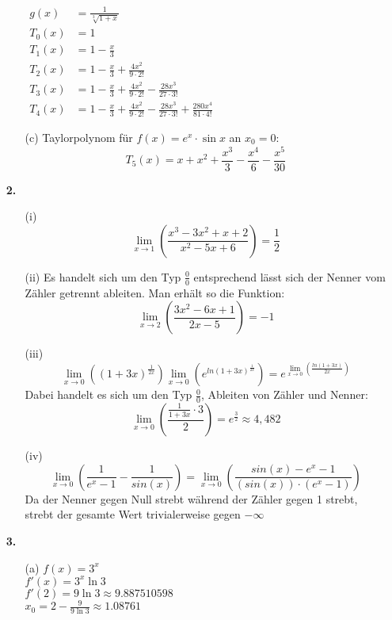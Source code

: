 \documentclass[a4paper,11pt,fleqn]{scrartcl}
\newcommand{\bra}[1]{\left(#1\right)}
\newcommand{\limxx}[2]{\lim\limits_{x \rightarrow #1}\bra{#2}}
\begin{document}
\begin{enumerate}
\begin{enumerate}
\begin{multicols}{2}
                    \(\begin{array}{ll}
                        g(x)   &= \frac{1}{\sqrt[3]{1+x}} \\[0.6em]
                        T_0(x) &= 1 \\[0.3em]
                        T_1(x) &= 1 - \frac{x}{3} \\[0.3em]
                        T_2(x) &= 1 - \frac{x}{3} + \frac{4x^2}{9 \cdot 2!} \\[0.3em]
                        T_3(x) &= 1 - \frac{x}{3} + \frac{4x^2}{9 \cdot 2!} - \frac{28x^3}{27 \cdot 3!} \\[0.3em]
                        T_4(x) &= 1 - \frac{x}{3} + \frac{4x^2}{9 \cdot 2!} - \frac{28x^3}{27 \cdot 3!} + \frac{280x^4}{81 \cdot 4!}
                    \end{array}\)
                \end{multicols}

            \item[(c)]
                Taylorpolynom für $f(x) = e^x \cdot \sin x$ an $x_0 = 0$:
                \[ T_5(x) = x + x^2 + \frac{x^3}{3} - \frac{x^4}{6} - \frac{x^5}{30} \]

        \end{enumerate}
    \item[\textbf{2.}]
        \begin{enumerate}
            \item[(i)]
                \[ \limxx{1}{\frac{x^3 - 3x^2 + x + 2}{x^2 - 5x + 6}} = \frac{1}{2}\]
            \item[(ii)]
                Es handelt sich um den Typ $\frac{0}{0}$ entsprechend lässt sich der Nenner vom Zähler getrennt ableiten.
                Man erhält so die Funktion: \[ \limxx{2}{\frac{3x^2 - 6x + 1}{2x - 5}} = -1\]
            \item[(iii)]
                \[ \limxx{0}{(1+3x)^\frac{1}{2x}} \limxx{0}{e^{ln(1+3x)^\frac{1}{2x}}} = e^{\limxx{0}{\frac{ln(1+3x)}{2x}}} \]
                Dabei handelt es sich um den Typ $\frac{0}{0}$, Ableiten von Zähler und Nenner:
                \[ \limxx{0}{\frac{ \frac{1}{1+3x} \cdot 3 }{2}} = e^{\frac{3}{2}} \approx 4,482 \]
            \item[(iv)]
                \[ \limxx{0}{ \frac{1}{e^x - 1} - \frac{1}{sin(x)}} = \limxx{0}{\frac{sin(x) - e^x - 1}{(sin(x)) \cdot (e^x-1)}} \]
                Da der Nenner gegen Null strebt während der Zähler gegen 1 strebt, strebt der gesamte Wert trivialerweise gegen $- \infty$
        \end{enumerate}
    \item[\textbf{3.}]
        \begin{enumerate}
            \item[(a)]
                \( f(x) = 3^x \)\\
                \( f'(x) = 3^x \ln 3 \)\\
                \( f'(2) = 9 \ln 3 \approx 9.887510598 \)\\
                \( x_0 = 2 - \frac{9}{9 \ln 3} \approx 1.08761 \)


\end{enumerate}
\end{enumerate}
\end{document}
